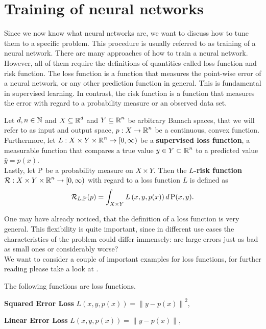 \section{Training of neural networks}

Since we now know what neural networks are, we want to discuss how to tune them to a specific problem. This procedure is usually referred to as training of a neural network. There are many approaches of how to train a neural network. However, all of them require the definitions of quantities called loss function and risk function. The loss function is a function that measures the point-wise error of a neural network, or any other prediction function in general. This is fundamental in supervised learning. In contrast, the risk function is a function that measures the error with regard to a probability measure or an observed data set.


\begin{definition}\label{def_loss_risk}
Let $d, n \in \operatorname{\mathbb{N}}$ and $X\subseteq \operatorname{\mathbb{R}}^d$ and $Y \subseteq \operatorname{\mathbb{R}}^n$ be arbitrary Banach spaces, that we will refer to as input and output space, $p:X \to \operatorname{\mathbb{R}}^n$ be a continuous, convex function.\\
Furthermore, let $L: X \times Y \times \operatorname{\mathbb{R}}^n \to [0, \infty)$ be a \textbf{supervised loss function}, a measurable function that compares a true value $y \in Y \subset \operatorname{\mathbb{R}}^n$ to a predicted value $\hat{y} = p(x)$.\\
Lastly, let $\operatorname{\text{P}}$ be a probability measure on $X \times Y$. Then the \textbf{$L$-risk function} $\operatorname{\mathcal{R}}: X \times Y \times \operatorname{\mathbb{R}}^n \to [0, \infty)$ with regard to a loss function $L$ is defined as
\begin{align*}
\operatorname{\mathcal{R}}_{L, \operatorname{\text{P}}}(p) = \int_{X\times Y} L\left(x, y, p(x) \right) d \operatorname{\text{P}}(x, y).
\end{align*}
\end{definition}

One may have already noticed, that the definition of a loss function is very general. This flexibility is quite important, since in different use cases the characteristics of the problem could differ immensely: are large errors just as bad as small ones or considerably worse?\\
We want to consider a couple of important examples for loss functions, for further reading please take a look at \cite[chapter~4.3]{goodfellow2016deep}.


\begin{example}
The following functions are loss functions.
\begin{mydescription}{}
\item[\textbf{Squared Error Loss}] $L(x, y, p(x)) = \left\|y - p(x)\right\|^2$,
\item[\textbf{Linear Error Loss}]  $L(x, y, p(x)) = \left\|y - p(x)\right\|$,
\end{mydescription}
\end{example}


